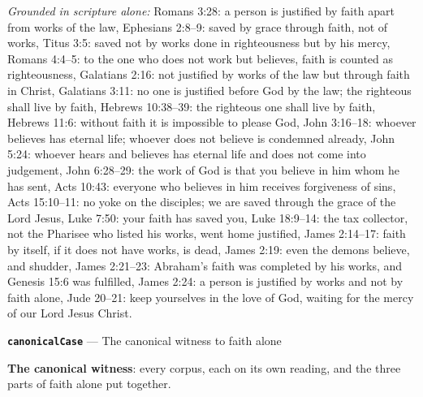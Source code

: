 \documentclass[11pt]{article}
\begin{document}
\emph{Grounded in scripture alone:} Romans 3:28: a person is justified by faith apart from works of the law, Ephesians 2:8–9: saved by grace through faith, not of works, Titus 3:5: saved not by works done in righteousness but by his mercy, Romans 4:4–5: to the one who does not work but believes, faith is counted as righteousness, Galatians 2:16: not justified by works of the law but through faith in Christ, Galatians 3:11: no one is justified before God by the law; the righteous shall live by faith, Hebrews 10:38–39: the righteous one shall live by faith, Hebrews 11:6: without faith it is impossible to please God, John 3:16–18: whoever believes has eternal life; whoever does not believe is condemned already, John 5:24: whoever hears and believes has eternal life and does not come into judgement, John 6:28–29: the work of God is that you believe in him whom he has sent, Acts 10:43: everyone who believes in him receives forgiveness of sins, Acts 15:10–11: no yoke on the disciples; we are saved through the grace of the Lord Jesus, Luke 7:50: your faith has saved you, Luke 18:9–14: the tax collector, not the Pharisee who listed his works, went home justified, James 2:14–17: faith by itself, if it does not have works, is dead, James 2:19: even the demons believe, and shudder, James 2:21–23: Abraham's faith was completed by his works, and Genesis 15:6 was fulfilled, James 2:24: a person is justified by works and not by faith alone, Jude 20–21: keep yourselves in the love of God, waiting for the mercy of our Lord Jesus Christ.
\par\medskip\noindent\textbf{\texttt{canonical\allowbreak{}Case}} --- The canonical witness to faith alone\par\nobreak\noindent
\textbf{The canonical witness}: every corpus, each on its own reading, and the three parts of faith alone put together.
\end{document}
